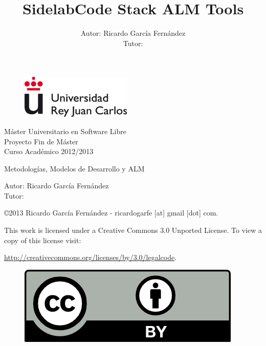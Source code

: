 \documentclass[a4paper, 12pt]{book}
\title{\textbf{SidelabCode Stack ALM Tools}}
\author{Autor: Ricardo Garc\'ia Fern\'andez
\\Tutor: }
\begin{document}
\renewcommand{\refname}{Bibliograf\'ia}  %
\renewcommand{\appendixname}{Ap\'endice}

\begin{titlepage}
\begin{center}

\begin{figure}[h]
    \begin{center}
        \includegraphics{urjc}
        \label{fig:urjc}
    \end{center}
\end{figure}

\begin{center}
\large
M\'aster Universitario en Software Libre
\\ Proyecto Fin de M\'aster
\\Curso Acad\'emico 2012/2013
\end{center}

\vspace{2cm}

\begin{center}

\LARGE
Metodolog\'ias, Modelos de Desarrollo y ALM

\large
Autor: Ricardo Garc\'ia Fern\'andez
\\Tutor:
\end{center}

\vfill

\begin{flushright}
\small
    \copyright 2013 Ricardo Garc\'ia Fern\'andez - ricardogarfe [at] gmail [dot] com.

    This work is licensed under a Creative Commons 3.0 Unported License.
    To view a copy of this license visit:
 
    \url{http://creativecommons.org/licenses/by/3.0/legalcode}.
\end{flushright}

\begin{figure}[h]
    \begin{flushright}	
        \includegraphics{by}
        \label{fig:by}
    \end{flushright}
\end{figure}

\end{center}
\end{titlepage}
\end{document}

